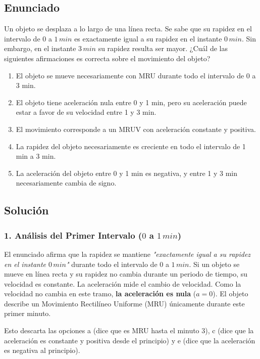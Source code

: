\documentclass[12pt, a4paper]{article}
\begin{document}
\newpage

\subsection*{Enunciado}
Un objeto se desplaza a lo largo de una línea recta. Se sabe que su rapidez en el intervalo de $0$ a $1 \, \si{min}$ es exactamente igual a su rapidez en el instante $0 \, \si{min}$. Sin embargo, en el instante $3 \, \si{min}$ su rapidez resulta ser mayor. ¿Cuál de las siguientes afirmaciones es correcta sobre el movimiento del objeto?

\begin{enumerate}[label=\alph*)]
    \item El objeto se mueve necesariamente con MRU durante todo el intervalo de 0 a 3 min.
    \item El objeto tiene aceleración nula entre 0 y 1 min, pero su aceleración puede estar a favor de su velocidad entre 1 y 3 min.
    \item El movimiento corresponde a un MRUV con aceleración constante y positiva.
    \item La rapidez del objeto necesariamente es creciente en todo el intervalo de 1 min a 3 min.
    \item La aceleración del objeto entre 0 y 1 min es negativa, y entre 1 y 3 min necesariamente cambia de signo.
\end{enumerate}

\subsection*{Solución}

\subsubsection*{1. Análisis del Primer Intervalo ($0$ a $1 \, \si{min}$)}
El enunciado afirma que la rapidez se mantiene \textit{"exactamente igual a su rapidez en el instante $0 \, \si{min}$"} durante todo el intervalo de $0$ a $1 \, \si{min}$.
Si un objeto se mueve en línea recta y su rapidez no cambia durante un periodo de tiempo, su velocidad es constante. 
La aceleración mide el cambio de velocidad. Como la velocidad no cambia en este tramo, \textbf{la aceleración es nula} ($a = 0$). El objeto describe un Movimiento Rectilíneo Uniforme (MRU) únicamente durante este primer minuto.

Esto descarta las opciones a (dice que es MRU hasta el minuto 3), c (dice que la aceleración es constante y positiva desde el principio) y e (dice que la aceleración es negativa al principio).
\end{document}
